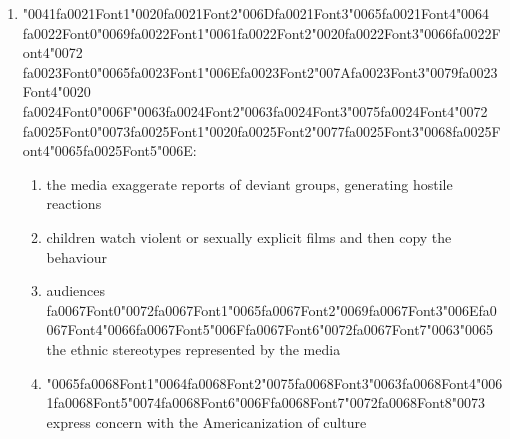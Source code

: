 \documentclass[12pt]{article}
\begin{document}
\begin{enumerate}[label=\arabic*.]
\begin{enumerate}[label=(\alph*)]
    \item audiences selectively interpret what they want to hear
    \item content analysis is the best way to identify the themes covered by the media
    \item audiences passively absorb whatever messages they are given
    \item social interaction reinforces the ideas and images that audiences select
\end{enumerate}
\item {\char"0041}{\csname fa0021Font1\endcsname\char"0020}{\csname fa0021Font2\endcsname\char"006D}{\csname fa0021Font3\endcsname\char"0065}{\csname fa0021Font4\endcsname\char"0064} {\csname fa0022Font0\endcsname\char"0069}{\csname fa0022Font1\endcsname\char"0061}{\csname fa0022Font2\endcsname\char"0020}{\csname fa0022Font3\endcsname\char"0066}{\csname fa0022Font4\endcsname\char"0072} {\csname fa0023Font0\endcsname\char"0065}{\csname fa0023Font1\endcsname\char"006E}{\csname fa0023Font2\endcsname\char"007A}{\csname fa0023Font3\endcsname\char"0079}{\csname fa0023Font4\endcsname\char"0020} {\csname fa0024Font0\endcsname\char"006F}{\char"0063}{\csname fa0024Font2\endcsname\char"0063}{\csname fa0024Font3\endcsname\char"0075}{\csname fa0024Font4\endcsname\char"0072} {\csname fa0025Font0\endcsname\char"0073}{\csname fa0025Font1\endcsname\char"0020}{\csname fa0025Font2\endcsname\char"0077}{\csname fa0025Font3\endcsname\char"0068}{\csname fa0025Font4\endcsname\char"0065}{\csname fa0025Font5\endcsname\char"006E}:
\begin{enumerate}[label=(\alph*)]
    \item the media exaggerate reports of deviant groups, generating hostile reactions
    \item children watch violent or sexually explicit films and then copy the behaviour
    \item audiences {\csname fa0067Font0\endcsname\char"0072}{\csname fa0067Font1\endcsname\char"0065}{\csname fa0067Font2\endcsname\char"0069}{\csname fa0067Font3\endcsname\char"006E}{\csname fa0067Font4\endcsname\char"0066}{\csname fa0067Font5\endcsname\char"006F}{\csname fa0067Font6\endcsname\char"0072}{\csname fa0067Font7\endcsname\char"0063}{\char"0065} the ethnic stereotypes represented by the media
    \item {\char"0065}{\csname fa0068Font1\endcsname\char"0064}{\csname fa0068Font2\endcsname\char"0075}{\csname fa0068Font3\endcsname\char"0063}{\csname fa0068Font4\endcsname\char"0061}{\csname fa0068Font5\endcsname\char"0074}{\csname fa0068Font6\endcsname\char"006F}{\csname fa0068Font7\endcsname\char"0072}{\csname fa0068Font8\endcsname\char"0073} express concern with the Americanization of culture

\end{enumerate}
\end{enumerate}
\end{document}
